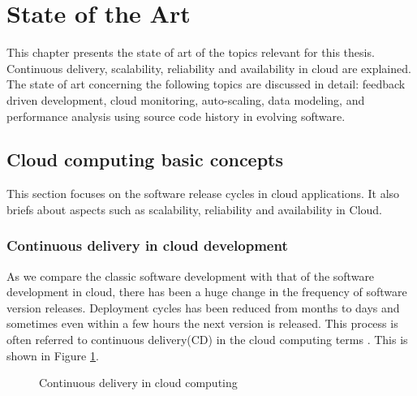 \documentclass[article,type=msc,colorback,12pt,accentcolor=tud8b,table]{tudthesis}
\begin{document}

	\cleardoublepage
 
 \hfill 
 \section{State of the Art}
  \hfill \break
 	
	This chapter presents the state of art of the topics relevant for this thesis. Continuous delivery, scalability, reliability and availability in cloud are explained. The state of art concerning the following topics are discussed in detail: feedback driven development, cloud monitoring, auto-scaling, data modeling, and performance analysis using source code history in evolving software.
	
		\subsection{Cloud computing basic concepts}
		
		This section focuses on the software release cycles in cloud applications. It also briefs about aspects such as scalability, reliability and availability in Cloud.
		
		\subsubsection{Continuous delivery in cloud development}
		As we compare the classic software development with that of the software development in cloud, there has been a huge change in the frequency of software version releases. Deployment cycles has been reduced from months to days and sometimes even within a few hours the next version is released. This process is often referred to continuous delivery(CD) in the cloud computing terms \cite{humble2010continuous}. This is shown in Figure \ref{fig:cd}. 
		
		\begin{figure}
			\begin{center}
				\makebox[\textwidth]{\texttt{[image: 2-1]}}
			\end{center}
			\caption{Continuous delivery in cloud computing \cite{humble2010continuous}}
			\label{fig:cd}
		\end{figure}
		
\end{document}
